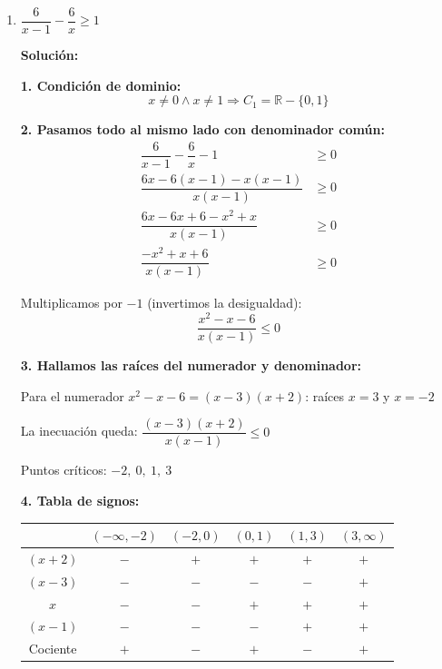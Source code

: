 \documentclass[12pt]{article}
\newcommand{\solucion}{%
    \vspace{0.8em}%
    \textbf{Solución:}%
}
\begin{document}
\begin{enumerate}[label=\alph*.-]
    \textbf{Representación gráfica:}

    \begin{center}
    \end{center}

    \newpage
    \item $\dfrac{6}{x-1} - \dfrac{6}{x} \geq 1$

    \solucion

    \textbf{1. Condición de dominio:}
    \[
    x \neq 0 \land x \neq 1 \Rightarrow C_1 = \mathbb{R} - \{0, 1\}
    \]

    \textbf{2. Pasamos todo al mismo lado con denominador común:}
    \begin{align*}
    \dfrac{6}{x-1} - \dfrac{6}{x} - 1 &\geq 0 \\[0.3em]
    \dfrac{6x - 6(x-1) - x(x-1)}{x(x-1)} &\geq 0 \\[0.3em]
    \dfrac{6x - 6x + 6 - x^2 + x}{x(x-1)} &\geq 0 \\[0.3em]
    \dfrac{-x^2 + x + 6}{x(x-1)} &\geq 0
    \end{align*}

    Multiplicamos por $-1$ (invertimos la desigualdad):
    \[
    \dfrac{x^2 - x - 6}{x(x-1)} \leq 0
    \]

    \textbf{3. Hallamos las raíces del numerador y denominador:}

    Para el numerador $x^2 - x - 6 = (x-3)(x+2)$: raíces $x = 3$ y $x = -2$

    La inecuación queda: $\dfrac{(x-3)(x+2)}{x(x-1)} \leq 0$

    Puntos críticos: $-2,\ 0,\ 1,\ 3$

    \textbf{4. Tabla de signos:}

    \begin{center}
    \begin{tabular}{|c|c|c|c|c|c|}
    \hline
    & $(-\infty,-2)$ & $(-2,0)$ & $(0,1)$ & $(1,3)$ & $(3,\infty)$ \\
    \hline
    $(x+2)$ & $-$ & $+$ & $+$ & $+$ & $+$ \\
    \hline
    $(x-3)$ & $-$ & $-$ & $-$ & $-$ & $+$ \\
    \hline
    $x$ & $-$ & $-$ & $+$ & $+$ & $+$ \\
    \hline
    $(x-1)$ & $-$ & $-$ & $-$ & $+$ & $+$ \\
    \hline
    Cociente & $+$ & $-$ & $+$ & $-$ & $+$ \\
    \hline
    \end{tabular}
    \end{center}


\end{enumerate}
\end{document}
